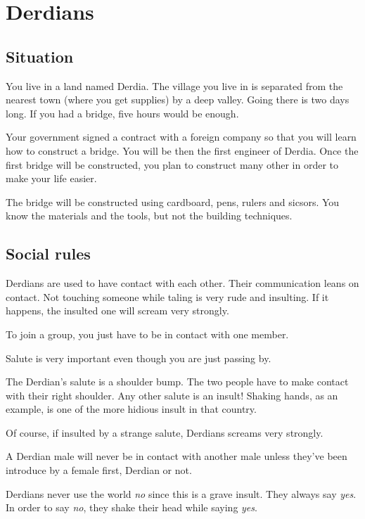 \documentclass[11pt,a4paper]{article}
\begin{document}
\section{Derdians}

\subsection{Situation}

You live in a land named Derdia.
The village you live in is separated from the nearest town (where you get supplies) by a deep valley.
Going there is two days long.
If you had a bridge, five hours would be enough.

Your government signed a contract with a foreign company so that you will learn how to construct a bridge.
You will be then the first engineer of Derdia.
Once the first bridge will be constructed, you plan to construct many other in order to make your life easier.

The bridge will be constructed using cardboard, pens, rulers and sicsors.
You know the materials and the tools, but not the building techniques.

\subsection{Social rules}

Derdians are used to have contact with each other.
Their communication leans on contact.
Not touching someone while taling is very rude and insulting.
If it happens, the insulted one will scream very strongly.

To join a group, you just have to be in contact with one member.

Salute is very important even though you are just passing by.

The Derdian's salute is a shoulder bump.
The two people have to make contact with their right shoulder.
Any other salute is an insult! Shaking hands, as an example, is one of the more hidious insult in that country.

Of course, if insulted by a strange salute, Derdians screams very strongly.

A Derdian male will never be in contact with another male unless they've been introduce by a female first, Derdian or not.

Derdians never use the world \emph{no} since this is a grave insult. They always say \emph{yes}. In order to say \emph{no}, they shake their head while saying \emph{yes}.
\end{document}
